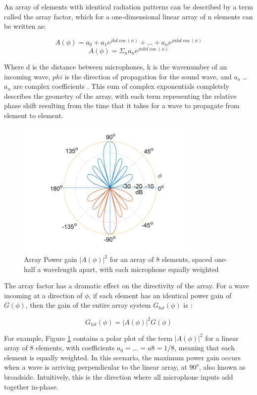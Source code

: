 \documentclass[10pt,journal,compsoc]{IEEEtran}
\begin{document}
An array of elements with identical radiation patterns can be described by a term called the array factor, which for a one-dimensional linear array of n elements can be written as:

\[
A(\phi) = a_0 + a_1e^{jkd\cos(\phi)} + ... + a_ne^{jnkd\cos(\phi)}
\]
\begin{equation}
    A(\phi) = \Sigma_na_ne^{jnkd\cos(\phi)}
\end{equation}

Where d  is the distance between microphones, k  is the wavenumber of an incoming wave, $phi$ is the direction of propagation for the sound wave,  and $a_o$ … $a_n$ are complex coefficients \cite{sophocles}. This sum of complex exponentials completely describes the geometry of the array, with each term representing the relative phase shift resulting from the time that it takes for a wave to propagate from element to element.

\begin{figure}[!htb]
    \centering
    \includegraphics[width=3.5in]{broadside}
    \caption{Array Power gain $|A(\phi)|^2$ for an array of 8 elements, spaced one-half a wavelength apart, with each microphone equally weighted}
    \label{fig:broadside}
\end{figure}

The array factor has a dramatic effect on the directivity of the array.  For a wave incoming at a direction of $\phi$, if each element has an identical power gain of $G(\phi)$, then the gain of the entire array system $G_{tot}(\phi)$ is \cite{sophocles}:

\begin{equation} \label{eq:pattern_mult}
G_{tot}(\phi) = |A(\phi)|^2G(\phi)
\end{equation}

For example, Figure \ref{fig:broadside} contains a polar plot of the term $|A(\phi)|^2$ for a linear array of 8 elements, with coefficients $a_0 = \ldots = a8 = 1/8$, meaning that each element is equally weighted. In this scenario, the maximum power gain occurs when a wave is arriving perpendicular to the linear array, at $90^o$, also known as broadside. Intuitively, this is the direction where all microphone inputs add together in-phase.
\end{document}
